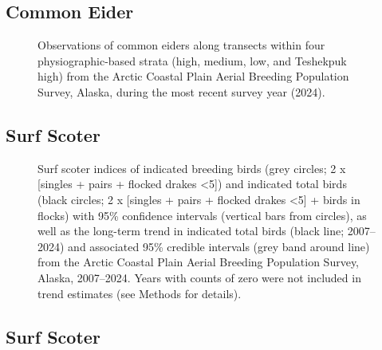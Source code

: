 \documentclass[
]{article}
\begin{document}
\newpage{}

\subsection*{Common Eider}\label{common-eider-2}

\begin{figure}


\caption{\label{fig-COEImap}Observations of common eiders along
transects within four physiographic-based strata (high, medium, low, and
Teshekpuk high) from the Arctic Coastal Plain Aerial Breeding Population
Survey, Alaska, during the most recent survey year (2024).}

\end{figure}%

\newpage{}

\subsection*{Surf Scoter}\label{surf-scoter}

\begin{figure}


\caption{\label{fig-SUSC}Surf scoter indices of indicated breeding birds
(grey circles; 2 x {[}singles + pairs + flocked drakes \textless5{]})
and indicated total birds (black circles; 2 x {[}singles + pairs +
flocked drakes \textless5{]} + birds in flocks) with 95\% confidence
intervals (vertical bars from circles), as well as the long-term trend
in indicated total birds (black line; 2007--2024) and associated 95\%
credible intervals (grey band around line) from the Arctic Coastal Plain
Aerial Breeding Population Survey, Alaska, 2007--2024. Years with counts
of zero were not included in trend estimates (see Methods for details).}

\end{figure}%

\newpage{}

\subsection*{Surf Scoter}\label{surf-scoter-1}
\end{document}
